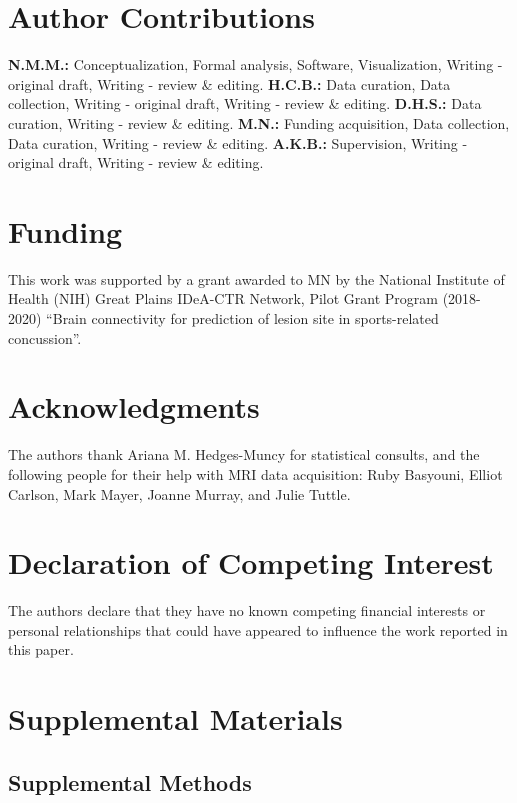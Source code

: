 \documentclass[12pt]{article}
\newcommand{\beginsupplement}{%
	\setcounter{table}{0}
	\renewcommand{\thetable}{S\arabic{table}}%
	\setcounter{figure}{0}
	\renewcommand{\thefigure}{S\arabic{figure}}%
}
\begin{document}
\section*{Author Contributions}
\label{sec:xtr-auth}
\textbf{N.M.M.:} Conceptualization, Formal analysis, Software, Visualization, Writing - original draft, Writing - review \& editing. \textbf{H.C.B.:} Data curation, Data collection, Writing - original draft, Writing - review \& editing. \textbf{D.H.S.:} Data curation, Writing - review \& editing. \textbf{M.N.:} Funding acquisition, Data collection, Data curation, Writing - review \& editing. \textbf{A.K.B.:} Supervision, Writing - original draft, Writing - review \& editing.


\section*{Funding}
\label{sec:xtr-fund}
This work was supported by a grant awarded to MN by the National Institute of Health (NIH) Great Plains IDeA-CTR Network, Pilot Grant Program (2018-2020) ``Brain connectivity for prediction of lesion site in sports-related concussion''.


\section*{Acknowledgments}
\label{sec:xtr-ack}
The authors thank Ariana M. Hedges-Muncy for statistical consults, and the following people for their help with MRI data acquisition: Ruby Basyouni, Elliot Carlson, Mark Mayer, Joanne Murray, and Julie Tuttle.


\section*{Declaration of Competing Interest}
\label{sec:xtr-dci}
The authors declare that they have no known competing financial interests or personal relationships that could have appeared to influence the work reported in this paper.


\pagebreak
\printbibliography
\pagebreak


\section{Supplemental Materials}
\label{sec:supp-materials}
\beginsupplement


\subsection{Supplemental Methods}
\label{ssec:supp-meth}
\end{document}
